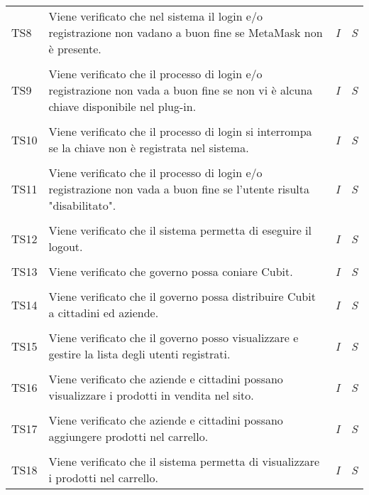 \begin{longtable}{ >{\centering}p{} >{}p{}
			>{\centering}p{} >{\centering}p{}}
		\tabularnewline
		\hypertarget{TS8}{TS8} & Viene verificato che nel sistema il login e/o 
		registrazione non vadano a buon fine se MetaMask non è presente. & 
		\textit{I} & \textit{S}\\  

		\tabularnewline
		\hypertarget{TS9}{TS9} & Viene verificato che il processo di login e/o 
		registrazione non vada a buon fine se non vi è alcuna chiave disponibile nel 
		plug-in. & \textit{I} & \textit{S}\\ 

		\tabularnewline
		\hypertarget{TS10}{TS10} & Viene verificato che il processo di login si 
		interrompa se la chiave non è registrata nel sistema. & 
		\textit{I} & \textit{S}\\  

		\tabularnewline
		\hypertarget{TS11}{TS11} & Viene verificato che il processo di login e/o 
		registrazione non vada a buon fine se l'utente risulta "disabilitato". & 
		\textit{I} & \textit{S}\\ 

		\tabularnewline
		\hypertarget{TS12}{TS12} & Viene verificato che il sistema permetta di 
		eseguire il logout. & \textit{I} & \textit{S}\\ 

		\tabularnewline
		\hypertarget{TS13}{TS13} & Viene verificato che governo possa coniare Cubit. & 
		\textit{I} & \textit{S}\\ 

		\tabularnewline
		\hypertarget{TS14}{TS14} & Viene verificato che il governo possa distribuire 
		Cubit a cittadini ed aziende. & \textit{I} & \textit{S}\\ 

		\tabularnewline
		\hypertarget{TS15}{TS15} & Viene verificato che il governo posso visualizzare 
		e gestire la lista degli utenti registrati. & \textit{I} & \textit{S}\\ 

		\tabularnewline
		\hypertarget{TS16}{TS16} & Viene verificato che aziende e cittadini possano 
		visualizzare i prodotti in vendita nel sito. & \textit{I} & 
		\textit{S}\\ 

		\tabularnewline
		\hypertarget{TS17}{TS17} & Viene verificato che aziende e cittadini possano 
		aggiungere prodotti nel carrello. & \textit{I} & \textit{S}\\ 

		\tabularnewline
		\hypertarget{TS18}{TS18} & Viene verificato che il sistema permetta di 
		visualizzare i prodotti nel carrello. & \textit{I} & \textit{S}\\ 


\end{longtable}
